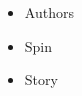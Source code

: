 \documentclass[white]{LRSguildcamp1}
\begin{document}
\name{\wPressRelease{}}

\begin{itemize}
\item Authors

\item Spin

\item Story

\end{itemize}
\end{document}
